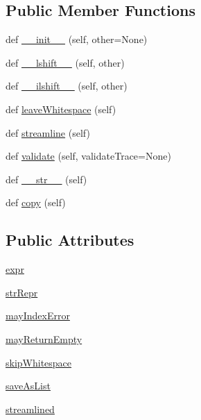 \subsection*{Public Member Functions}
\begin{DoxyCompactItemize}
\item 
def \hyperlink{classpip_1_1__vendor_1_1pyparsing_1_1Forward_a34358ba6096dfed9672834ef8569e3a6}{\+\_\+\+\_\+init\+\_\+\+\_\+} (self, other=None)
\item 
def \hyperlink{classpip_1_1__vendor_1_1pyparsing_1_1Forward_a1f89febf5003e104465b0332a30c70a4}{\+\_\+\+\_\+lshift\+\_\+\+\_\+} (self, other)
\item 
def \hyperlink{classpip_1_1__vendor_1_1pyparsing_1_1Forward_a28f45e427d8cdefda9516d67b32a44e1}{\+\_\+\+\_\+ilshift\+\_\+\+\_\+} (self, other)
\item 
def \hyperlink{classpip_1_1__vendor_1_1pyparsing_1_1Forward_a4ed667b109557562d143e82e9167a823}{leave\+Whitespace} (self)
\item 
def \hyperlink{classpip_1_1__vendor_1_1pyparsing_1_1Forward_ae54b9bd49543a2cbfafbeb0a4dea22ed}{streamline} (self)
\item 
def \hyperlink{classpip_1_1__vendor_1_1pyparsing_1_1Forward_a6ce255d231e9eddd8d30f245fef7f4bf}{validate} (self, validate\+Trace=None)
\item 
def \hyperlink{classpip_1_1__vendor_1_1pyparsing_1_1Forward_ac359399d38447eb5d5e4072d0e43b36b}{\+\_\+\+\_\+str\+\_\+\+\_\+} (self)
\item 
def \hyperlink{classpip_1_1__vendor_1_1pyparsing_1_1Forward_a7adf9a89cc8eee3ce83a1dc689bdeb7e}{copy} (self)
\end{DoxyCompactItemize}
\subsection*{Public Attributes}
\begin{DoxyCompactItemize}
\item 
\hyperlink{classpip_1_1__vendor_1_1pyparsing_1_1Forward_a8ba40ac62b630b0152c0f071ecf889f6}{expr}
\item 
\hyperlink{classpip_1_1__vendor_1_1pyparsing_1_1Forward_a95520a645adacefde283510e7c6e41dc}{str\+Repr}
\item 
\hyperlink{classpip_1_1__vendor_1_1pyparsing_1_1Forward_ad92959eadf615030a42b28b128958c7a}{may\+Index\+Error}
\item 
\hyperlink{classpip_1_1__vendor_1_1pyparsing_1_1Forward_a38fca4a62aa6d01c90ca3fb639165980}{may\+Return\+Empty}
\item 
\hyperlink{classpip_1_1__vendor_1_1pyparsing_1_1Forward_aa6c6e3b6ce2541adefe6e5e0ea7acad8}{skip\+Whitespace}
\item 
\hyperlink{classpip_1_1__vendor_1_1pyparsing_1_1Forward_a9aceca5e162f5f9eb5faad1386bdc6e5}{save\+As\+List}
\item 
\hyperlink{classpip_1_1__vendor_1_1pyparsing_1_1Forward_a820a9d20507284d8e8111ad3d810a996}{streamlined}
\end{DoxyCompactItemize}
